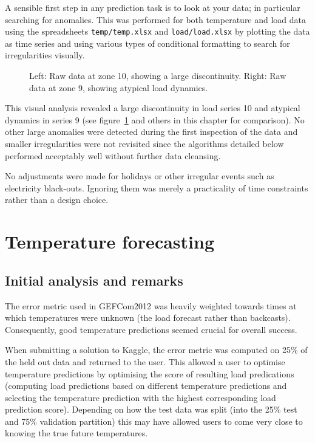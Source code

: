 \label{sec:cleans}

A sensible first step in any prediction task is to look at your data; in particular searching for anomalies.
This was performed for both temperature and load data using the spreadsheets \texttt{temp/temp.xlsx} and \texttt{load/load.xlsx} by plotting the data as time series and using various types of conditional formatting to search for irregularities visually.

\begin{figure}[ht]
  \begin{center}
    
  \end{center}
  \caption[Examples of unusual load dynamics.]{Left: Raw data at zone 10, showing a large discontinuity. Right: Raw data at zone 9, showing atypical load dynamics.}
  \label{fig:load}
\end{figure}

This visual analysis revealed a large discontinuity in load series 10 and atypical dynamics in series 9 (see figure~\ref{fig:load} and others in this chapter for comparison).
No other large anomalies were detected during the first inspection of the data and smaller irregularities were not revisited since the algorithms detailed below performed acceptably well without further data cleansing.

No adjustments were made for holidays or other irregular events such as electricity black-outs.
Ignoring them was merely a practicality of time constraints rather than a design choice.

\section{Temperature forecasting}

\label{sec:temp}

\subsection{Initial analysis and remarks}

The error metric used in GEFCom2012 was heavily weighted towards times at which temperatures were unknown (\ie the load forecast rather than backcasts).
Consequently, good temperature predictions seemed crucial for overall success.

When submitting a solution to Kaggle, the error metric was computed on 25\% of the held out data and returned to the user.
This allowed a user to optimise temperature predictions by optimising the score of resulting load predications (\ie computing load predictions based on different temperature predictions and selecting the temperature prediction with the highest corresponding load prediction score).
Depending on how the test data was split (into the 25\% test and 75\% validation partition) this may have allowed users to come very close to knowing the true future temperatures.

